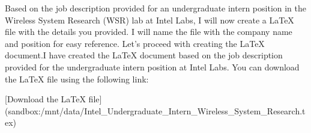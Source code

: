 Based on the job description provided for an undergraduate intern position in the Wireless System Research (WSR) lab at Intel Labs, I will now create a LaTeX file with the details you provided. I will name the file with the company name and position for easy reference. Let's proceed with creating the LaTeX document.I have created the LaTeX document based on the job description provided for the undergraduate intern position at Intel Labs. You can download the LaTeX file using the following link:

[Download the LaTeX file](sandbox:/mnt/data/Intel_Undergraduate_Intern_Wireless_System_Research.tex)